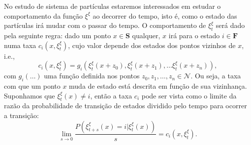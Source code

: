 \documentclass[twoside,openright,titlepage,numbers=noenddot,headinclude,  lineheaders footinclude=true,cleardoublepage=empty,
                                BCOR=5mm,paper=a4,fontsize=12pt ]{scrbook}
\theoremstyle{definition}
\begin{document}
No estudo de sistema de partículas estaremos
interessados em estudar o comportamento da função
$\xi^{\xi}$ ao decorrer do tempo, isto é, como 
o estado das partículas irá mudar com o passar do tempo.
O comportamento de $\xi^{\xi}_t$ será dado pela seguinte
regra:
dado um ponto $x \in \mathbf{S}$ qualquer,  
$x$ irá para o estado $i \in \mathbf{F}$ numa 
taxa $c_i(x, \xi^{\xi}_t) $, cujo valor
depende dos estados dos pontos vizinhos de $x$, i.e.,
\[
c_i(x, \xi^{\xi}_t) = g_i( \xi^{\xi}_t(x + z_0), 
\xi^{\xi}_t(x + z_1), \ldots
\xi^{\xi}_t(x + z_n) ),
\]
com $g_i(\ldots)$ uma função definida nos pontos 
$z_0, z_1, \ldots, z_n \in \mathscr{N}$.
Ou seja, a taxa com que um ponto $x$ muda de estado
está descrita em função de sua vizinhança.
Suponhamos que $\xi^{\xi}_t(x) \neq i$, então
a taxa $c_i$ pode ser vista como o limite da 
razão da probabilidade de transição de estados
dividido pelo tempo para ocorrer a transição:
\[
\lim_{s \rightarrow 0}
\frac
{ P( \xi^{\xi}_{t+s}(x) = i| \xi^{\xi}_t(x) ) }
{s}
= c_i(x, \xi^{\xi}_t).
\]

\end{document}
